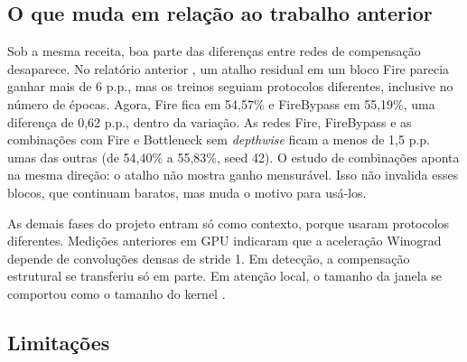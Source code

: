 \documentclass[conference]{IEEEtran}
\begin{document}
\subsection{O que muda em relação ao trabalho anterior}

Sob a mesma receita, boa parte das diferenças entre redes de compensação desaparece. No relatório anterior \cite{souza2026relatorio}, um atalho residual em um bloco Fire \cite{iandola2016squeezenet} parecia ganhar mais de 6 p.p., mas os treinos seguiam protocolos diferentes, inclusive no número de épocas. Agora, Fire fica em 54,57\% e FireBypass em 55,19\%, uma diferença de 0,62 p.p., dentro da variação. As
redes Fire, FireBypass e as combinações com Fire e Bottleneck sem \textit{depthwise} ficam a menos de 1,5 p.p. umas das outras (de 54,40\% a 55,83\%, seed 42). O estudo de combinações aponta na mesma direção: o atalho não mostra ganho mensurável. Isso não invalida esses blocos, que continuam baratos, mas muda o motivo para usá-los.

As demais fases do projeto entram só como contexto, porque usaram protocolos diferentes. Medições anteriores em GPU indicaram que a aceleração Winograd depende de convoluções densas de stride 1. Em detecção, a compensação estrutural se transferiu só em parte. Em atenção local, o tamanho da janela se comportou como o tamanho do kernel \cite{souza2026relatorio}.

\subsection{Limitações}
\end{document}

